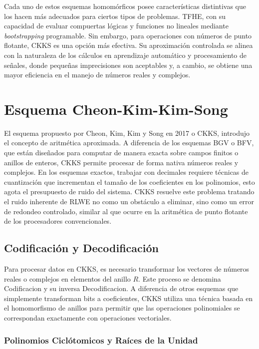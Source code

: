 Cada uno de estos esquemas homomórficos posee características distintivas que los hacen más adecuados para ciertos tipos de problemas. TFHE, con su capacidad de evaluar compuertas lógicas y funciones no lineales mediante \textit{bootstrapping} programable. Sin embargo, para operaciones con números de punto flotante, CKKS es una opción más efectiva. Su aproximación controlada se alinea con la naturaleza de los cálculos en aprendizaje automático y procesamiento de señales, donde pequeñas imprecisiones son aceptables y, a cambio, se obtiene una mayor eficiencia en el manejo de números reales y complejos.

\section{Esquema Cheon-Kim-Kim-Song}

El esquema propuesto por Cheon, Kim, Kim y Song en 2017 \cite{CKKS17} o CKKS, introdujo el concepto de aritmética aproximada. A diferencia de los esquemas BGV o BFV, que están diseñados para computar de manera exacta sobre campos finitos o anillos de enteros, CKKS permite procesar de forma nativa números reales y complejos. En los esquemas exactos, trabajar con decimales requiere técnicas de cuantización que incrementan el tamaño de los coeficientes en los polinomios, esto agota el presupuesto de ruido del sistema. CKKS resuelve este problema tratando el ruido inherente de RLWE no como un obstáculo a eliminar, sino como un error de redondeo controlado, similar al que ocurre en la aritmética de punto flotante de los procesadores convencionales.

\subsection{Codificación y Decodificación}

Para procesar datos en CKKS, es necesario transformar los vectores de números reales o complejos en elementos del anillo $R$. Este proceso se denomina Codificacion y su inversa Decodificacion. A diferencia de otros esquemas que simplemente transforman bits a coeficientes, CKKS utiliza una técnica basada en el homomorfismo de anillos para permitir que las operaciones polinomiales se correspondan exactamente con operaciones vectoriales.

\subsubsection{Polinomios Ciclótomicos y Raíces de la Unidad}


